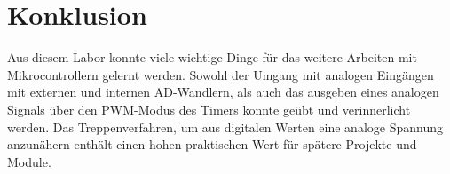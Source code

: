 \documentclass{article}
\begin{document}
\section{Konklusion}
\label{sec:konklusion}

Aus diesem Labor konnte viele wichtige Dinge für das weitere Arbeiten mit Mikrocontrollern gelernt werden. Sowohl der Umgang mit analogen Eingängen mit externen und internen AD-Wandlern, als auch das ausgeben eines analogen Signals über den PWM-Modus des Timers konnte geübt und verinnerlicht werden. Das Treppenverfahren, um aus digitalen Werten eine analoge Spannung anzunähern enthält einen hohen praktischen Wert für spätere Projekte und Module.
\end{document}
